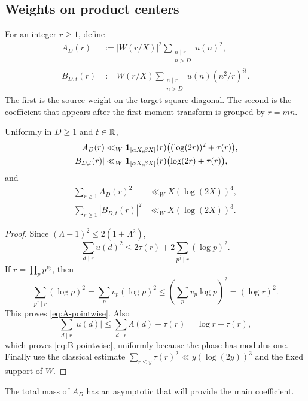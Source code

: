 \subsection{Weights on product centers}

For an integer $r\geq1$, define
\begin{align}
 A_D(r)
 &:={}|W(r/X)|^2
 \sum_{\substack{n\mid r\\n>D}}u(n)^2,
 \label{eq:product-diagonal-weight}\\
 B_{D,t}(r)
 &:={}W(r/X)
 \sum_{\substack{n\mid r\\n>D}}
 u(n)(n^2/r)^{it}.
 \label{eq:product-signed-weight}
\end{align}
The first is the source weight on the target-square diagonal.  The second
is the coefficient that appears after the first-moment transform is
grouped by $r=mn$.

\begin{lemma}
\label{lem:product-ledgers}
Uniformly in $D\geq1$ and $t\in\mathbb R$,
\begin{align}
 A_D(r)&\ll_W\mathbf 1_{[\alpha X,\beta X]}(r)
 \bigl((\log(2r))^2+\tau(r)\bigr),
 \label{eq:A-pointwise}\\
 |B_{D,t}(r)|&\ll_W\mathbf 1_{[\alpha X,\beta X]}(r)
 \bigl(\log(2r)+\tau(r)\bigr),
 \label{eq:B-pointwise}
\end{align}
and
\begin{align}
 \sum_{r\geq1}A_D(r)^2&\ll_WX(\log(2X))^4,
 \label{eq:A-second-moment}\\
 \sum_{r\geq1}|B_{D,t}(r)|^2&\ll_WX(\log(2X))^3.
 \label{eq:B-second-moment}
\end{align}
\end{lemma}

\begin{proof}
Since $(\Lambda-1)^2\leq2(1+\Lambda^2)$,
\[
 \sum_{d\mid r}u(d)^2
 \leq2\tau(r)+2\sum_{p^j\mid r}(\log p)^2.
\]
If $r=\prod_pp^{v_p}$, then
\[
 \sum_{p^j\mid r}(\log p)^2
 =\sum_pv_p(\log p)^2
 \leq\left(\sum_pv_p\log p\right)^2=(\log r)^2.
\]
This proves \eqref{eq:A-pointwise}.  Also
\[
 \sum_{d\mid r}|u(d)|
 \leq\sum_{d\mid r}\Lambda(d)+\tau(r)
 =\log r+\tau(r),
\]
which proves \eqref{eq:B-pointwise}, uniformly because the phase has
modulus one.  Finally use the classical estimate
$\sum_{r\leq y}\tau(r)^2\ll y(\log(2y))^3$ and the fixed support of $W$.
\end{proof}

The total mass of $A_D$ has an asymptotic that will provide the main
coefficient.


